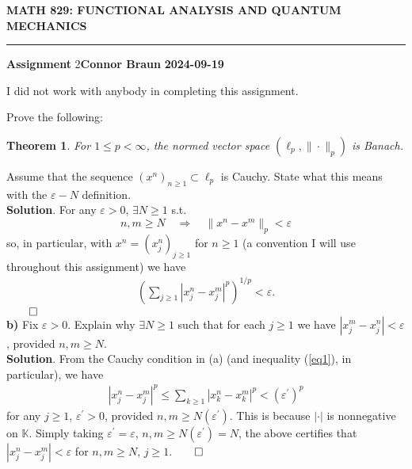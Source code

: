 \documentclass[10pt]{article}
\newcommand{\mbb}[1]{\mathbb{#1}}
\newcommand{\1}[1]{\mathbbm{1}_{#1}}
\newtheorem{theorem}{Theorem}
\begin{document}
    \begin{center}
        {\bf\large{MATH 829: FUNCTIONAL ANALYSIS AND QUANTUM MECHANICS}}
        \smallskip
        \hrule
        \smallskip
        {\bf Assignment} 2\hfill {\bf Connor Braun} \hfill {\bf 2024-09-19}
    \end{center}
    \vspace{5pt}
    \begin{center}
        \begin{minipage}{\dimexpr\paperwidth-10cm}
            I did not work with anybody in completing this assignment.
        \end{minipage}
    \end{center}
    \noindent{} Prove the following:
    \begin{theorem}
        For $1\leq p<\infty$, the normed vector space $(\ell_p,\|\cdot\|_p)$ is
        Banach.
    \end{theorem} 
     Assume that the sequence $(x^n)_{n\geq 1}\subset\ell_p$ is
    Cauchy. State what this means with the $\varepsilon-N$ definition.\\[5pt]
    {\bf Solution}. For any $\varepsilon>0$, $\exists N\geq 1$ s.t.
    \[n,m\geq N\quad\Rightarrow\quad \|x^n-x^m\|_p<\varepsilon\] so, in
    particular, with $x^n=(x^n_j)_{j\geq 1}$ for $n\geq 1$ (a convention I will
    use throughout this assignment) we have
    \begin{align}
        \left(\sum_{j\geq 1}|x^n_j-x^m_j|^p\right)^{1/p}<\varepsilon.\label{eq1}
    \end{align}
    \hfill{$\qed$}\\[5pt]
    {\bf b)} Fix $\varepsilon>0$. Explain why $\exists N\geq 1$ such that for
    each $j\geq 1$ we have $|x^m_j-x^n_j|<\varepsilon$, provided $n,m\geq
    N$.\\[5pt]
    {\bf Solution}. From the Cauchy condition in (a) (and inequality
    (\ref{eq1}), in particular), we have
    \begin{align}
        |x^n_j-x^m_j|^p\leq\sum_{k\geq1}|x^n_k-x^m_k|^p<(\varepsilon^\prime)^p\label{eq2}
    \end{align}
    for any $j\geq 1$, $\varepsilon^\prime>0$, provided $n,m\geq
    N(\varepsilon^\prime)$. This is because $|\cdot|$ is nonnegative on
    $\mbb{K}$. Simply taking $\varepsilon^\prime=\varepsilon$, $n,m\geq
    N(\varepsilon^\prime)=N$, the above certifies that
    $|x^n_j-x^m_j|<\varepsilon$ for $n,m\geq N$, $j\geq 1$.\hfill{$\qed$}\\[5pt]
\end{document}
